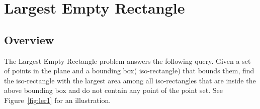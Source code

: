
\ccParDims


\chapter{Largest Empty Rectangle}
\label{chapterLer}

\section{Overview}
The Largest Empty Rectangle problem answers the following query. Given
a set of points in the plane and a bounding box( iso-rectangle) that bounds them,
find the iso-rectangle with the largest area among all iso-rectangles that are
inside the above bounding box and do not contain any point of the point set.
See Figure~\ref{fig:ler1} for an illustration.

